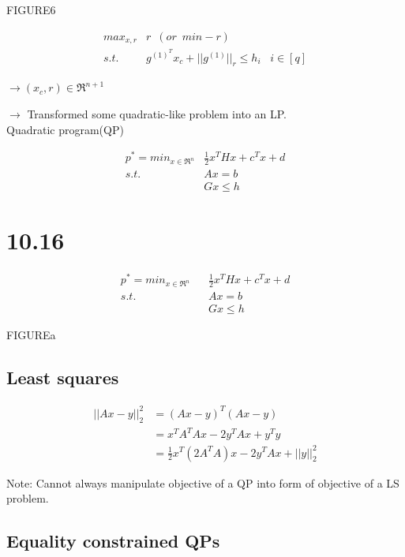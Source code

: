 FIGURE6

\begin{align*}
max_{x, r} &r\,\,\,(or\,\,\,min -r)\\
s.t. &g^{(1)^T}x_c + ||g^{(1)}||_r\leq h_i\,\,\,\,\, i\in [q]
\end{align*}

$\rightarrow(x_c, r)\in \Re^{n+1}$

$\rightarrow$ Transformed some quadratic-like problem into an LP.\\


Quadratic program(QP)

\begin{align*}
p^* = min_{x\in \Re^n} &\frac{1}{2}x^THx + c^Tx + d\\
s.t. \,\,\, &Ax = b\\
&Gx \leq h
\end{align*}




\section{10.16}


\begin{align*}
p^* = min_{x\in \Re^n}\,\,\,\,\, &\frac{1}{2}x^THx + c^Tx + d\\
 s.t.\,\,\,\,\, &Ax = b\\
 &Gx\leq h
\end{align*}


FIGUREa

\subsection{Least squares}
\begin{align*}
||Ax - y||_2^2 &= (Ax - y)^T(Ax - y)\\
&= x^TA^TAx - 2y^TAx + y^Ty\\
&= \frac{1}{2}x^T(2A^TA)x - 2y^TAx + ||y||_2^2
\end{align*}

Note: Cannot always manipulate objective of a QP into form of objective of a LS problem.\\

\subsection{Equality constrained QPs}

